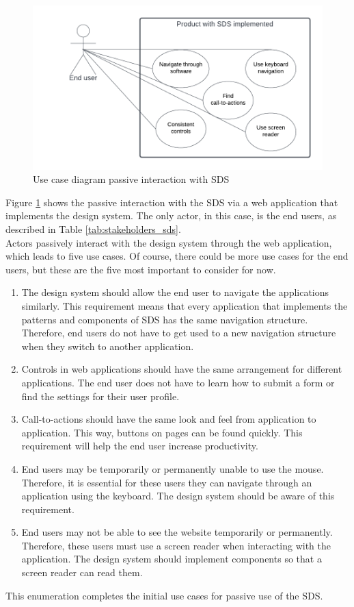 \begin{figure}[htbp]
    \centerline{\includegraphics[width=\linewidth]{images/use_case_diagram_passive.png}}
    \caption{Use case diagram passive interaction with \ac{SDS}}
    \label{use_case_passive}
\end{figure}
Figure \ref{use_case_passive} shows the passive interaction with the SDS via a web application that implements the design system. The only actor, in this case, is the end users, as described in Table \ref{tab:stakeholders_sds}. \\ 
Actors passively interact with the design system through the web application, which leads to five use cases. Of course, there could be more use cases for the end users, but these are the five most important to consider for now. \\
\begin{enumerate}
    \item The design system should allow the end user to navigate the applications similarly. This requirement means that every application that implements the patterns and components of SDS has the same navigation structure. Therefore, end users do not have to get used to a new navigation structure when they switch to another application. 
    \item Controls in web applications should have the same arrangement for different applications. The end user does not have to learn how to submit a form or find the settings for their user profile. 
    \item Call-to-actions should have the same look and feel from application to application. This way, buttons on pages can be found quickly. This requirement will help the end user increase productivity. 
    \item End users may be temporarily or permanently unable to use the mouse. Therefore, it is essential for these users they can navigate through an application using the keyboard. The design system should be aware of this requirement. 
    \item End users may not be able to see the website temporarily or permanently. Therefore, these users must use a screen reader when interacting with the application. The design system should implement components so that a screen reader can read them.
\end{enumerate}
This enumeration completes the initial use cases for passive use of the SDS. \\

